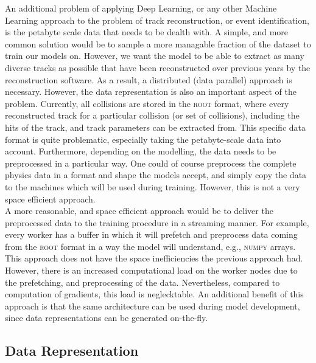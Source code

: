 An additional problem of applying Deep Learning, or any other Machine Learning approach to the problem of track reconstruction, or event identification, is the petabyte scale data that needs to be dealth with. A simple, and more common solution would be to sample a more managable fraction of the dataset to train our models on. However, we want the model to be able to extract as many diverse tracks as possible that have been reconstructed over previous years by the reconstruction software. As a result, a distributed (data parallel) approach is necessary. However, the data representation is also an important aspect of the problem. Currently, all collisions are stored in the \textsc{root} format, where every reconstructed track for a particular collision (or set of collisions), including the hits of the track, and track parameters can be extracted from. This specific data format is quite problematic, especially taking the petabyte-scale data into account. Furthermore, depending on the modelling, the data needs to be preprocessed in a particular way. One could of course preprocess the complete physics data in a format and shape the models accept, and simply copy the data to the machines which will be used during training. However, this is not a very space efficient approach.\\

A more reasonable, and space efficient approach would be to deliver the preprocessed data to the training procedure in a streaming manner. For example, every worker has a buffer in which it will prefetch and preprocess data coming from the \textsc{root} format in a way the model will understand, e.g., \textsc{numpy} arrays. This approach does not have the space inefficiencies the previous approach had. However, there is an increased computational load on the worker nodes due to the prefetching, and preprocessing of the data. Nevertheless, compared to computation of gradients, this load is neglecktable. An additional benefit of this approach is that the same architecture can be used during model development, since data representations can be generated on-the-fly.\\

\subsection{Data Representation}
\label{sec:experiment_cms_data_representation}

